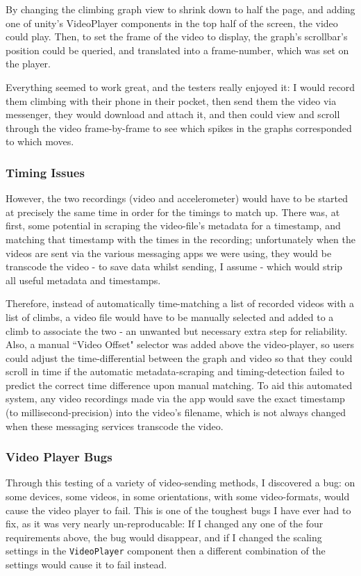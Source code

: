By changing the climbing graph view to shrink down to half the page, and adding one of unity's VideoPlayer components in the top half of the screen, the video could play.
Then, to set the frame of the video to display, the graph's scrollbar's position could be queried, and translated into a frame-number, which was set on the player.

Everything seemed to work great, and the testers really enjoyed it:
I would record them climbing with their phone in their pocket, then send them the video via messenger, they would download and attach it, and then could view and scroll through the video frame-by-frame to see which spikes in the graphs corresponded to which moves.

\subsubsection{Timing Issues}
However, the two recordings (video and accelerometer) would have to be started at precisely the same time in order for the timings to match up.
There was, at first, some potential in scraping the video-file's metadata for a timestamp, and matching that timestamp with the times in the recording; unfortunately when the videos are sent via the various messaging apps we were using, they would be transcode the video - to save data whilst sending, I assume - which would strip all useful metadata and timestamps.

Therefore, instead of automatically time-matching a list of recorded videos with a list of climbs, a video file would have to be manually selected and added to a climb to associate the two - an unwanted but necessary extra step for reliability.
Also, a manual ``Video Offset" selector was added above the video-player, so users could adjust the time-differential between the graph and video so that they could scroll in time if the automatic metadata-scraping and timing-detection failed to predict the correct time difference upon manual matching.
To aid this automated system, any video recordings made via the app would save the exact timestamp (to millisecond-precision) into the video's filename, which is not always changed when these messaging services transcode the video.

\subsubsection{Video Player Bugs}
Through this testing of a variety of video-sending methods, I discovered a bug:
on some devices, some videos, in some orientations, with some video-formats, would cause the video player to fail.
This is one of the toughest bugs I have ever had to fix, as it was very nearly un-reproducable: If I changed any one of the four requirements above, the bug would disappear, and if I changed the scaling settings in the \verb|VideoPlayer| component then a different combination of the settings would cause it to fail instead.

